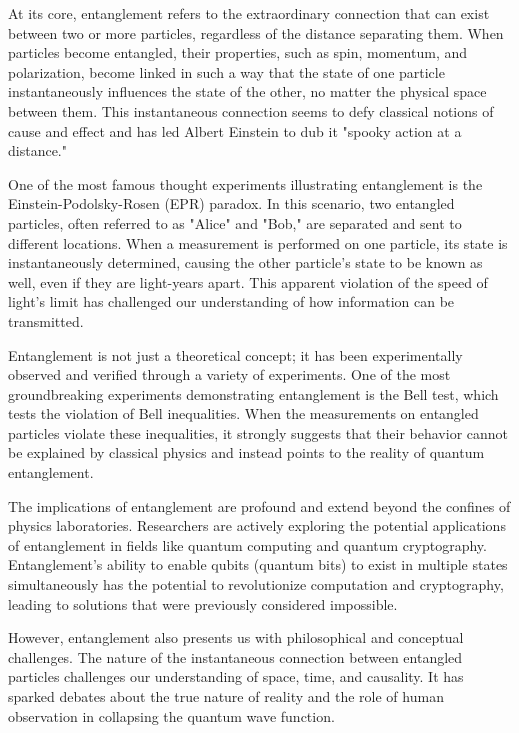 \documentclass{book}
\begin{document}
At its core, entanglement refers to the extraordinary connection that can exist between two or more particles, regardless of the distance separating them. When particles become entangled, their properties, such as spin, momentum, and polarization, become linked in such a way that the state of one particle instantaneously influences the state of the other, no matter the physical space between them. This instantaneous connection seems to defy classical notions of cause and effect and has led Albert Einstein to dub it "spooky action at a distance."

One of the most famous thought experiments illustrating entanglement is the Einstein-Podolsky-Rosen (EPR) paradox. In this scenario, two entangled particles, often referred to as "Alice" and "Bob," are separated and sent to different locations. When a measurement is performed on one particle, its state is instantaneously determined, causing the other particle's state to be known as well, even if they are light-years apart. This apparent violation of the speed of light's limit has challenged our understanding of how information can be transmitted.

Entanglement is not just a theoretical concept; it has been experimentally observed and verified through a variety of experiments. One of the most groundbreaking experiments demonstrating entanglement is the Bell test, which tests the violation of Bell inequalities. When the measurements on entangled particles violate these inequalities, it strongly suggests that their behavior cannot be explained by classical physics and instead points to the reality of quantum entanglement.

The implications of entanglement are profound and extend beyond the confines of physics laboratories. Researchers are actively exploring the potential applications of entanglement in fields like quantum computing and quantum cryptography. Entanglement's ability to enable qubits (quantum bits) to exist in multiple states simultaneously has the potential to revolutionize computation and cryptography, leading to solutions that were previously considered impossible.

However, entanglement also presents us with philosophical and conceptual challenges. The nature of the instantaneous connection between entangled particles challenges our understanding of space, time, and causality. It has sparked debates about the true nature of reality and the role of human observation in collapsing the quantum wave function.
\end{document}
